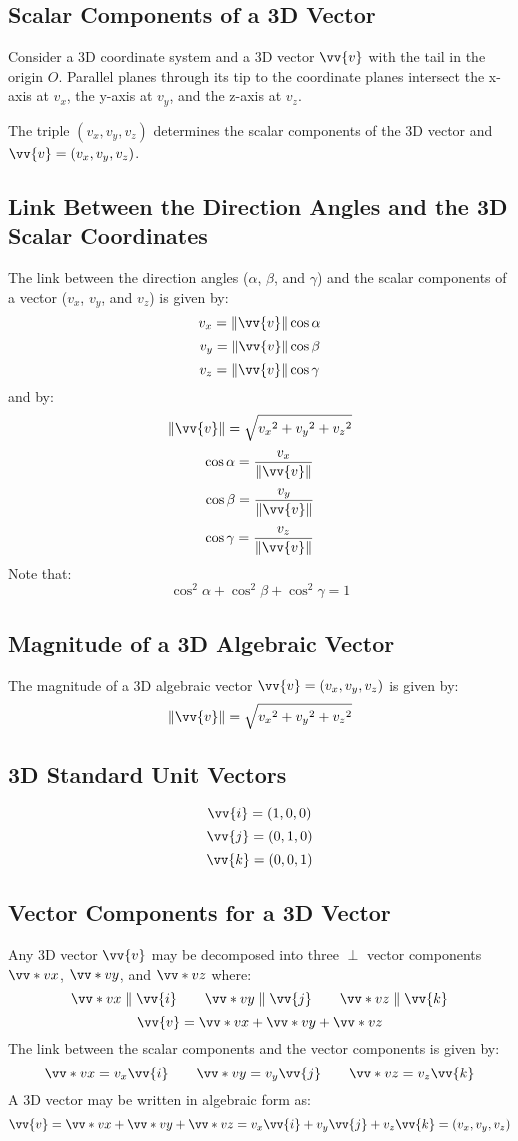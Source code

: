 		\subsection{Scalar Components of a 3D Vector}
			Consider a 3D coordinate system and a 3D vector $\vv{v}$ with the tail in the origin $O$. Parallel planes through its tip to the coordinate planes intersect the x-axis at $v_x$, the y-axis at $v_y$, and the z-axis at $v_z$.

			The triple $(v_x, v_y, v_z)$ determines the scalar components of the 3D vector and $\vv{v} = (v_x, v_y, v_z)$.
		\subsection{Link Between the Direction Angles and the 3D Scalar Coordinates}
			The link between the direction angles ($\alpha$, $\beta$, and $\gamma$) and the scalar components of a vector ($v_x$, $v_y$, and $v_z$) is given by:
			\[v_x = \|\vv{v}\|\cos\alpha\]
			\[v_y = \|\vv{v}\|\cos\beta\]
			\[v_z = \|\vv{v}\|\cos\gamma\]
			and by:
			\[\|\vv{v}\| = \sqrt{{v_x}^2 + {v_y}^2 + {v_z}^2}\]
			\[\cos\alpha = \frac{v_x}{\|\vv{v}\|}\]
			\[\cos\beta = \frac{v_y}{\|\vv{v}\|}\]
			\[\cos\gamma = \frac{v_z}{\|\vv{v}\|}\]
			Note that:
			\[\cos^2\alpha + \cos^2\beta + \cos^2\gamma = 1\]
		\subsection{Magnitude of a 3D Algebraic Vector}
			The magnitude of a 3D algebraic vector $\vv{v} = (v_x, v_y, v_z)$ is given by:
			\[\|\vv{v}\| = \sqrt{{v_x}^2 + {v_y}^2 + {v_z}^2}\]
		\subsection{3D Standard Unit Vectors}
			\[\vv{i} = (1,0,0)\]
			\[\vv{j} = (0,1,0)\]
			\[\vv{k} = (0,0,1)\]
		\subsection{Vector Components for a 3D Vector}
			Any 3D vector $\vv{v}$ may be decomposed into three $\perp$ vector components $\vv*{v}{x}$, $\vv*{v}{y}$, and $\vv*{v}{z}$ where:
			\[\vv*{v}{x} \parallel \vv{i} \qquad \vv*{v}{y} \parallel \vv{j} \qquad \vv*{v}{z} \parallel \vv{k}\]
			\[\vv{v} = \vv*{v}{x} + \vv*{v}{y} + \vv*{v}{z}\]
			The link between the scalar components and the vector components is given by:
			\[\vv*{v}{x} = v_x\vv{i} \qquad \vv*{v}{y} = v_y\vv{j} \qquad \vv*{v}{z} = v_z\vv{k}\]
			A 3D vector may be written in algebraic form as:
			\[\vv{v} = \vv*{v}{x} + \vv*{v}{y} + \vv*{v}{z} = v_x\vv{i} + v_y\vv{j} + v_z\vv{k} = (v_x, v_y, v_z)\]
